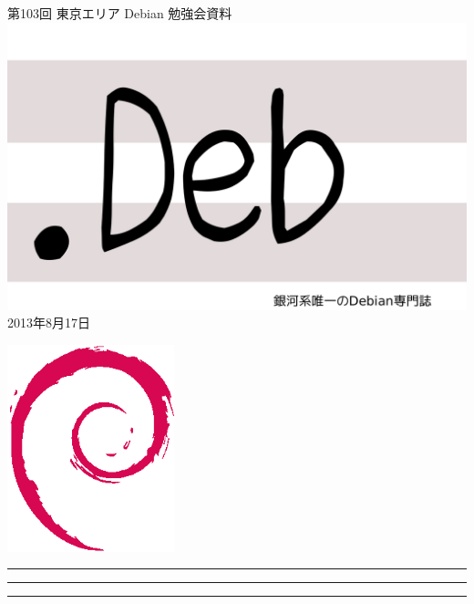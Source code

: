 \documentclass[mingoth,a4paper]{jsarticle}
\newcommand{\debmtgyear}{2013}
\newcommand{\debmtgmonth}{8}
\newcommand{\debmtgdate}{17}
\newcommand{\debmtgnumber}{103}
\begin{document}
\begin{titlepage}
\thispagestyle{empty}

\vspace*{-2cm}
第\debmtgnumber{}回 東京エリア Debian 勉強会資料\\
\hspace*{-2cm}
\includegraphics{image2012-natsu/dotdeb.pdf}\\
\hfill{}\debmtgyear{}年\debmtgmonth{}月\debmtgdate{}日



\vspace*{-2cm}
\hfill{}\includegraphics[height=6cm]{image200502/openlogo-nd.eps}
\end{titlepage}

\newpage

\begin{minipage}[b]{0.2\hsize}
 \colorbox{titleback}{}
\end{minipage}
\begin{minipage}[b]{0.8\hsize}
\hrule
\vspace{2mm}
\hrule
\begin{multicols}{2}
\tableofcontents
\end{multicols}
\vspace{2mm}
\hrule
\end{minipage}
\end{document}

